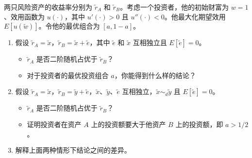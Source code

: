 \begin{problem}
 两只风险资产的收益率分别为 $\tilde{r}_{A}$ 和 $\tilde{r}_{B}$。考虑一个投资者，他的初始财富为 $w=1$、效用函数为 $u(\cdot)$，其中 $u'(\cdot)>0$ 且 $u''(\cdot)<0$。他最大化期望效用 $E[u(\tilde{w})]$。令他的最优组合为 $[a,1-a]$。
\begin{enumerate}[label=(\alph*)]
    \item 假设 $\tilde{r}_{A}=\tilde{x}$，$\tilde{r}_{B}=\tilde{x}+\tilde{e}$，其中 $\tilde{e}$ 和 $\tilde{x}$ 互相独立且 $E[\tilde{e}]=0$。
    \begin{itemize}
        \item $\tilde{r}_{A}$ 是否二阶随机占优于 $\tilde{r}_{B}$？
        \item 对于投资者的最优投资组合 $a$，你能得到什么样的结论？
    \end{itemize}
    \item 假设 $\tilde{r}_{A}=\tilde{x}$，$\tilde{r}_{B}=\tilde{y}+\tilde{e}$，$\tilde{x}$、$\tilde{y}$、$\tilde{e}$ 互相独立，$\tilde{x}\sim_{d}\tilde{y}$ 且 $E[\tilde{e}]=0$。
    \begin{itemize}
        \item $\tilde{r}_{A}$ 是否二阶随机占优于 $\tilde{r}_{B}$？
        \item 证明投资者在资产 $A$ 上的投资额要大于他资产 $B$ 上的投资额，即 $a>1/2$。
    \end{itemize}
    \item 解释上面两种情形下结论之间的差异。
\end{enumerate}
\end{problem}
